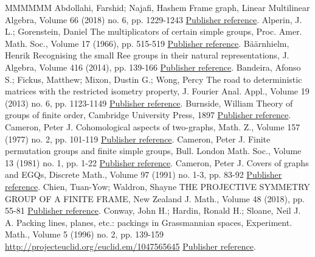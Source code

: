\begin{thebibliography}{MMMMMM}
 Abdollahi, Farshid; Najafi, Hashem Frame graph, Linear Multilinear Algebra, Volume 66 (2018) no. 6, pp. 1229-1243 \href{https://alco.centre-mersenne.org/articles/10.5802/alco.324/#AN:18}{Publisher reference}.
 Alperin, J. L.; Gorenstein, Daniel The multiplicators of certain simple groups, Proc. Amer. Math. Soc., Volume 17 (1966), pp. 515-519 \href{https://alco.centre-mersenne.org/articles/10.5802/alco.324/#AlperinGorenstein:66}{Publisher reference}.
 Bäärnhielm, Henrik Recognising the small Ree groups in their natural representations, J. Algebra, Volume 416 (2014), pp. 139-166 \href{https://alco.centre-mersenne.org/articles/10.5802/alco.324/#Baarnhielm:14}{Publisher reference}.
 Bandeira, Afonso S.; Fickus, Matthew; Mixon, Dustin G.; Wong, Percy The road to deterministic matrices with the restricted isometry property, J. Fourier Anal. Appl., Volume 19 (2013) no. 6, pp. 1123-1149 \href{https://alco.centre-mersenne.org/articles/10.5802/alco.324/#BandeiraFickusMixonWong:13}{Publisher reference}.
 Burnside, William Theory of groups of finite order, Cambridge University Press, 1897 \href{https://alco.centre-mersenne.org/articles/10.5802/alco.324/#Burnside:97}{Publisher reference}.
 Cameron, Peter J. Cohomological aspects of two-graphs, Math. Z., Volume 157 (1977) no. 2, pp. 101-119 \href{https://alco.centre-mersenne.org/articles/10.5802/alco.324/#Cameron:77}{Publisher reference}.
 Cameron, Peter J. Finite permutation groups and finite simple groups, Bull. London Math. Soc., Volume 13 (1981) no. 1, pp. 1-22 \href{https://alco.centre-mersenne.org/articles/10.5802/alco.324/#Cameron:81}{Publisher reference}.
 Cameron, Peter J. Covers of graphs and EGQs, Discrete Math., Volume 97 (1991) no. 1-3, pp. 83-92 \href{https://alco.centre-mersenne.org/articles/10.5802/alco.324/#Cameron:91}{Publisher reference}.
 Chien, Tuan-Yow; Waldron, Shayne THE PROJECTIVE SYMMETRY GROUP OF A FINITE FRAME, New Zealand J. Math., Volume 48 (2018), pp. 55-81 \href{https://alco.centre-mersenne.org/articles/10.5802/alco.324/#ChienWaldron:18}{Publisher reference}.
 Conway, John H.; Hardin, Ronald H.; Sloane, Neil J. A. Packing lines, planes, etc.: packings in Grassmannian spaces, Experiment. Math., Volume 5 (1996) no. 2, pp. 139-159 \url{http://projecteuclid.org/euclid.em/1047565645} \href{https://alco.centre-mersenne.org/articles/10.5802/alco.324/#ConwayHardinSloane:96}{Publisher reference}.

\end{thebibliography}
